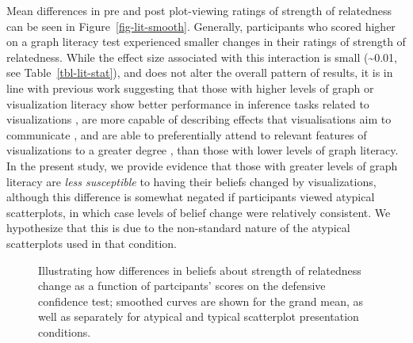 \documentclass[manuscript,screen,review]{acmart}
\begin{document}
Mean differences in pre and post plot-viewing ratings of strength of
relatedness can be seen in Figure~\ref{fig-lit-smooth}. Generally,
participants who scored higher on a graph literacy test experienced
smaller changes in their ratings of strength of relatedness. While the
effect size associated with this interaction is small
(\textasciitilde0.01, see Table~\ref{tbl-lit-stat}), and does not alter
the overall pattern of results, it is in line with previous work
suggesting that those with higher levels of graph or visualization
literacy show better performance in inference tasks related to
visualizations \citep{canham_2010}, are more capable of describing
effects that visualisations aim to communicate \citep{shah_2011}, and
are able to preferentially attend to relevant features of visualizations
to a greater degree \citep{okan_2015}, than those with lower levels of
graph literacy. In the present study, we provide evidence that those
with greater levels of graph literacy are \emph{less susceptible} to
having their beliefs changed by visualizations, although this difference
is somewhat negated if participants viewed atypical scatterplots, in
which case levels of belief change were relatively consistent. We
hypothesize that this is due to the non-standard nature of the atypical
scatterplots used in that condition.

\begin{figure}


\caption{\label{fig-dc-smooth}Illustrating how differences in beliefs
about strength of relatedness change as a function of partcipants'
scores on the defensive confidence test; smoothed curves are shown for
the grand mean, as well as separately for atypical and typical
scatterplot presentation conditions.}

\end{figure}%
\end{document}
